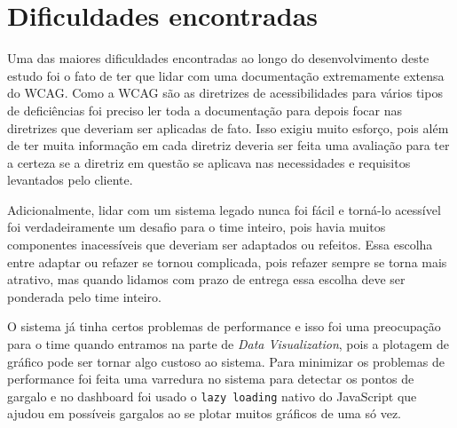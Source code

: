 \section{Dificuldades encontradas}
\label{sec:dificuldades}
{
Uma das maiores dificuldades encontradas ao longo do desenvolvimento deste estudo foi o fato de ter que lidar com uma documentação extremamente extensa do WCAG. Como a WCAG são as diretrizes de acessibilidades para vários tipos de deficiências foi preciso ler toda a documentação para depois focar nas diretrizes que deveriam ser aplicadas de fato. Isso exigiu muito esforço, pois além de ter muita informação em cada diretriz deveria ser feita uma avaliação para ter a certeza se a diretriz em questão se aplicava nas necessidades e requisitos levantados pelo cliente.

Adicionalmente, lidar com um sistema legado nunca foi fácil e torná-lo acessível foi verdadeiramente um desafio para o time inteiro, pois havia muitos componentes inacessíveis que deveriam ser adaptados ou refeitos. Essa escolha entre adaptar ou refazer se tornou complicada, pois refazer sempre se torna mais atrativo, mas quando lidamos com prazo de entrega essa escolha deve ser ponderada pelo time inteiro.

O sistema já tinha certos problemas de performance e isso foi uma preocupação para o time quando entramos na parte de \textit{Data Visualization}, pois a plotagem de gráfico pode ser tornar algo custoso ao sistema. Para minimizar os problemas de performance foi feita uma varredura no sistema para detectar os pontos de gargalo e no dashboard foi usado o \lstinline{lazy loading} nativo do JavaScript que ajudou em possíveis gargalos ao se plotar muitos gráficos de uma só vez. 
}



